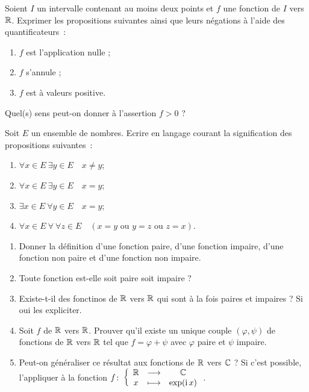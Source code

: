 %
\begin{exercice}

Soient $I$ un intervalle contenant au moins deux points et $f$ une fonction de $I$ vers $\mathbb{R}$. Exprimer les
propositions suivantes ainsi que leurs négations à l'aide des quantificateurs~:
\begin{enumerate}
    \item $f$ est l'application nulle ;
    \item $f$ s'annule ;
    \item $f$ est à valeurs positive.
\end{enumerate}
Quel(s) sens peut-on donner à l'assertion $f>0$ ?
\end{exercice}
%
\begin{exercice}

Soit $E$ un ensemble de nombres. Ecrire en langage courant la signification des propositions suivantes~:
\begin{enumerate}
    \item $\forall x \in E \ \exists y \in E \quad x \neq y$;
    \item $\forall x \in E \ \exists y \in E \quad x = y$;
    \item $\exists x \in E \ \forall y \in E \quad x = y$;
    \item $\forall x \in E \ \forall \ \forall z \in E \quad (x=y \textrm{~ou~} y=z \textrm{~ou~} z=x)$.
\end{enumerate}
\end{exercice}
%
\begin{exercice}

\begin{enumerate}
    \item Donner la définition d'une fonction paire, d'une fonction impaire, d'une fonction non paire et d'une fonction non impaire.
    \item Toute fonction est-elle soit paire soit impaire ?
    \item Existe-t-il des fonctinos de $\mathbb{R}$ vers $\mathbb{R}$ qui sont à la fois paires  et impaires ? Si oui les expliciter.
    \item Soit $f$ de $\mathbb{R}$ vers $\mathbb{R}$. Prouver qu'il existe un unique couple $(\varphi, \psi)$ de fonctions de $\mathbb{R}$ vers
        $\mathbb{R}$ tel que $f=\varphi+\psi$ avec $\varphi$ paire et $\psi$ impaire.
    \item Peut-on généraliser ce résultat aux fonctions de $\mathbb{R}$ vers $\mathbb{C}$ ? Si c'est possible, l'appliquer à la fonction $f\colon \left\{\begin{array}{ccc} \mathbb{R} & \longrightarrow &\mathbb{C}\\ x & \longmapsto & \exp(\operatorname{i} x) \end{array} \right.$.
\end{enumerate}
\end{exercice}
